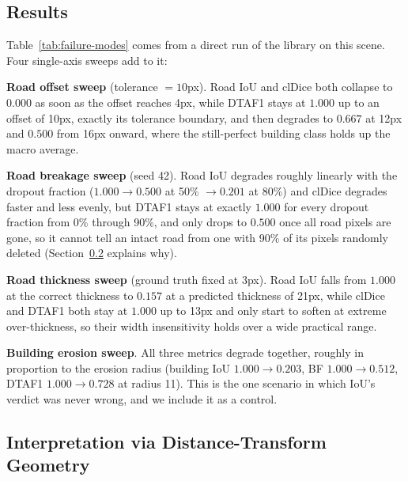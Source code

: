 \subsection{Results}
\label{subsec:motivation-results}

Table~\ref{tab:failure-modes} comes from a direct run of the library on this scene. Four
single-axis sweeps add to it:

\textbf{Road offset sweep} (tolerance $=10$px). Road IoU and clDice both collapse to $0.000$ as
soon as the offset reaches 4px, while DTAF1 stays at $1.000$ up to an offset of 10px, exactly its
tolerance boundary, and then degrades to $0.667$ at 12px and $0.500$ from 16px onward, where the
still-perfect building class holds up the macro average.

\textbf{Road breakage sweep} (seed 42). Road IoU degrades roughly linearly with the dropout
fraction ($1.000 \to 0.500$ at 50\% $\to 0.201$ at 80\%) and clDice degrades faster and less
evenly, but DTAF1 stays at exactly $1.000$ for every dropout fraction from 0\% through 90\%, and
only drops to $0.500$ once all road pixels are gone, so it cannot tell an intact road from one with
90\% of its pixels randomly deleted (Section~\ref{subsec:motivation-interpretation} explains why).

\textbf{Road thickness sweep} (ground truth fixed at 3px). Road IoU falls from $1.000$ at the
correct thickness to $0.157$ at a predicted thickness of 21px, while clDice and DTAF1 both stay at
$1.000$ up to 13px and only start to soften at extreme over-thickness, so their width insensitivity
holds over a wide practical range.

\textbf{Building erosion sweep}. All three metrics degrade together, roughly in proportion to the
erosion radius (building IoU $1.000{\to}0.203$, BF $1.000{\to}0.512$, DTAF1 $1.000{\to}0.728$ at
radius 11). This is the one scenario in which IoU's verdict was never wrong, and we include it as a
control.

\subsection{Interpretation via Distance-Transform Geometry}
\label{subsec:motivation-interpretation}

